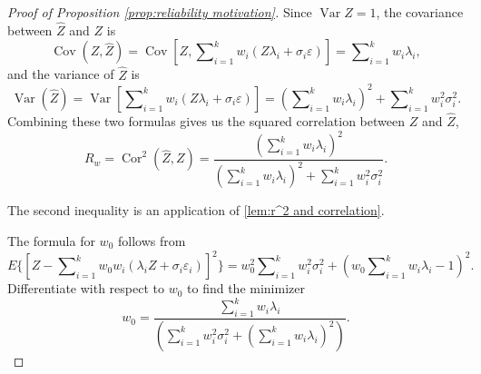 \documentclass[twoside]{article}
\DeclareMathOperator{\Var}{Var}
\DeclareMathOperator{\Cor}{Cor}
\DeclareMathOperator{\Cov}{Cov}
\DeclareMathOperator{\tsum}{\textstyle \sum}
\begin{document}
\begin{proof}[Proof of Proposition \ref{prop:reliability motivation}]\label{proof:reliability motivation}
Since $\Var Z=1$, the covariance between $\hat{Z}$ and $Z$
is
\begin{equation}
\Cov(Z,\hat{Z})=\Cov[Z,{\textstyle\tsum_{i=1}^{k}w_{i}}(Z\lambda_{i}+\sigma_{i}\varepsilon)]  =  {\textstyle\tsum_{i=1}^{k}w_{i}}\lambda_{i},
\end{equation}
and the variance of $\hat{Z}$ is
\[
\Var(\hat{Z})=\Var[{\textstyle\tsum_{i=1}^{k}}w_{i}(Z\lambda_{i}+\sigma_{i}\varepsilon)]
=({\textstyle\tsum_{i=1}^{k}}w_{i}\lambda_{i})^{2}+\tsum_{i=1}^{k}w_{i}^{2}\sigma_{i}^{2}.
\]
Combining these two formulas gives us the squared correlation between
$Z$ and $\hat{Z}$,
\begin{equation}
 R_w=\Cor^{2}(\hat{Z},Z) = \frac{(\tsum_{i=1}^{k}w_{i}\lambda_{i})^{2}}{(\tsum_{i=1}^{k}w_{i}\lambda_{i})^{2}+\tsum_{i=1}^{k}w_{i}^{2}\sigma_{i}^{2}}.
\end{equation}

The second inequality is an application of \cref{lem:r^2 and correlation}.

The formula for $w_0$ follows from
\begin{equation*}
E\{[Z-\tsum_{i=1}^{k}w_{0}w_{i}(\lambda_{i}Z+\sigma_{i}\varepsilon_{i})]^{2}\} = w_{0}^{2}\tsum_{i=1}^{k}w_{i}^{2}\sigma_{i}^{2}+(w_{0}\tsum_{i=1}^{k}w_{i}\lambda_{i}-1)^{2}.
\end{equation*}
Differentiate with respect to $w_{0}$ to find the minimizer
\[
w_{0}=\frac{\tsum_{i=1}^{k}w_{i}\lambda_{i}}{(\tsum_{i=1}^{k}w_{i}^{2}\sigma_{i}^{2}+(\tsum_{i=1}^{k}w_{i}\lambda_{i})^{2})}.
\]
\end{proof}
\end{document}
